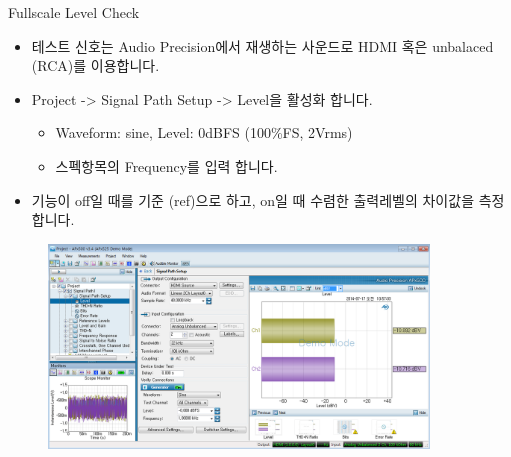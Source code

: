 \documentclass{beamer}
\begin{document}
	
	\begin{frame}[t]{Fullscale Level Check}
		\begin{itemize}
			\item 테스트 신호는 Audio Precision에서 재생하는 사운드로 HDMI 혹은 unbalaced (RCA)를 이용합니다.
			\item Project -> Signal Path Setup -> Level을 활성화 합니다.
			\begin{itemize}
				\item Waveform: sine, Level: 0dBFS (100\%FS, 2Vrms)
				\item 스펙항목의 Frequency를 입력 합니다.
			\end{itemize}
			\item 기능이 off일 때를 기준 (ref)으로 하고, on일 때 수렴한 출력레벨의 차이값을 측정합니다.
		\end{itemize}
		
		\begin{figure}[b]
			\includegraphics[width=0.9\textwidth]{figure/apsetting/fullscaleLevel.png}
		\end{figure}
		
	\end{frame}
	
\end{document}
